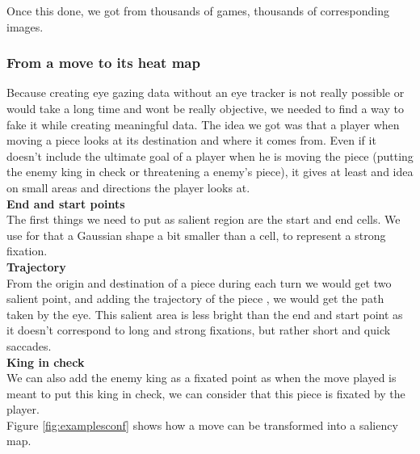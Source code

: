 Once this done, we got from thousands of games, thousands of corresponding images.

\subsubsection{From a move to its heat map}

Because creating eye gazing data without an eye tracker is not really possible or would take a long time and wont be really objective, we needed to find a way to fake it while creating meaningful data. 
The idea we got was that a player when moving a piece looks at its destination and where it comes from. Even if it doesn't include the ultimate goal of a player when he is moving the piece (putting the enemy king in check or threatening a enemy's piece), it gives at least and idea on small areas and directions the player looks at.\\ 

\textbf{End and start points}\\

The first things we need to put as salient region are the start and end cells. We use for that a Gaussian shape a bit smaller than a cell, to represent a strong fixation.\\ 


\textbf{Trajectory}\\

From the origin and destination of a piece during each turn we would get two salient point, and adding the trajectory of the piece , we would get the path taken by the eye. This salient area is less bright than the end and start point as it doesn't correspond to long and strong fixations, but rather short and quick saccades. \\ 


\textbf{King in check}\\

We can also add the enemy king as a fixated point as when the move played is meant to put this king in check, we can consider that this piece is fixated by the player.\\ 

Figure \ref{fig:examplesconf} shows how a move can be transformed into a saliency map.

